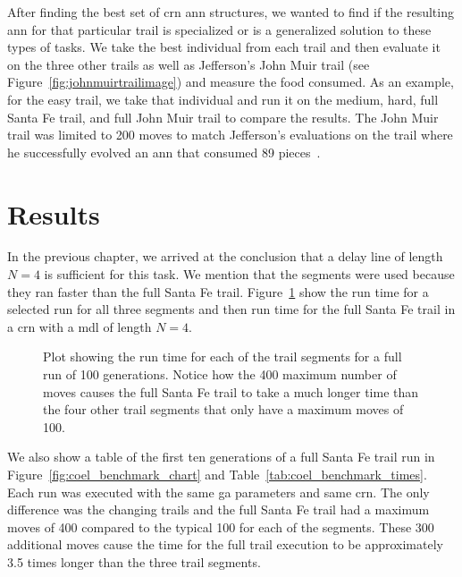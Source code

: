 After finding the best set of \gls{crn} \gls{ann} structures, we wanted to find if the resulting \gls{ann} for that particular trail is specialized or is a generalized solution to these types of tasks. We take the best individual from each trail and then evaluate it on the three other trails as well as Jefferson's John Muir trail (see Figure~\ref{fig:johnmuirtrailimage}) and measure the food consumed. As an example, for the easy trail, we take that individual and run it on the medium, hard, full Santa Fe trail, and full John Muir trail to compare the results. The John Muir trail was limited to 200 moves to match Jefferson's evaluations on the trail where he successfully evolved an \gls{ann} that consumed 89 pieces~\cite{Jefferson1992-ph}.

\section{Results}
In the previous chapter, we arrived at the conclusion that a delay line of length $N=4$ is sufficient for this task. We mention that the segments were used because they ran faster than the full Santa Fe trail. Figure~\ref{fig:coel_time_benchmark} show the run time for a selected run for all three segments and then run time for the full Santa Fe trail in a \gls{crn} with a \gls{mdl} of length $N=4$. 

\begin{figure}[hbt]
\centering
{}
\caption[COEL Run Time Benchmark]{Plot showing the run time for each of the trail segments for a full run of 100 generations. Notice how the 400 maximum number of moves causes the full Santa Fe trail to take a much longer time than the four other trail segments that only have a maximum moves of 100.}
\label{fig:coel_time_benchmark}
\end{figure}

We also show a table of the first ten generations of a full Santa Fe trail run in Figure~\ref{fig:coel_benchmark_chart} and Table~\ref{tab:coel_benchmark_times}. Each run was executed with the same \gls{ga} parameters and same \gls{crn}. The only difference was the changing trails and the full Santa Fe trail had a maximum moves of 400 compared to the typical 100 for each of the segments. These 300 additional moves cause the time for the full trail execution to be approximately 3.5 times longer than the three trail segments.

